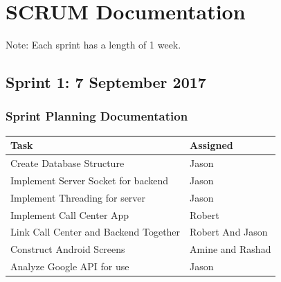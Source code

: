 \documentclass[a4paper,12pt]{article}
\begin{document}
\section{SCRUM Documentation}
Note: Each sprint has a length of 1 week.
\subsection{Sprint 1: 7 September 2017}

\subsubsection{Sprint Planning Documentation}
\begin{tabular}{|p{9.5cm}|p{3.5cm}|}
\hline
Task & Assigned \\ \hline
Create Database Structure & Jason \\ \hline
Implement Server Socket for backend & Jason \\ \hline
Implement Threading for server & Jason \\ \hline
Implement Call Center App & Robert \\ \hline
Link Call Center and Backend Together & Robert And Jason \\ \hline
Construct Android Screens & Amine and Rashad \\ \hline
Analyze Google API for use & Jason \\ \hline
\end{tabular}
\end{document}
